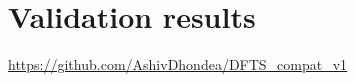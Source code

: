 \chapter{Validation results} \label{chapt:valid}

\url{https://github.com/AshivDhondea/DFTS_compat_v1}
